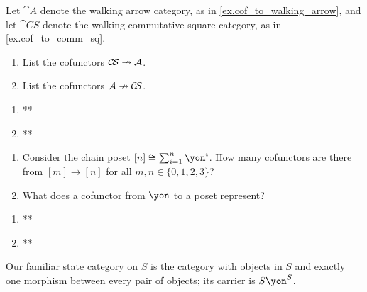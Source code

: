 \documentclass[Book-Poly]{subfiles}
\begin{document}
\begin{exercise}
Let $\cat{A}$ denote the walking arrow category, as in \cref{ex.cof_to_walking_arrow}, and let $\cat{C\!S}$ denote the walking commutative square category, as in \cref{ex.cof_to_comm_sq}.
\begin{enumerate}
    \item List the cofunctors $\mathcal{C\!S}\nrightarrow\mathcal{A}$.
    \item List the cofunctors $\mathcal{A}\nrightarrow\mathcal{C\!S}$.\qedhere
\end{enumerate}
\begin{solution}
\begin{enumerate}
    \item **
    \item **
\end{enumerate}
\end{solution}
\end{exercise}

\begin{exercise}
\begin{enumerate}
	\item Consider the chain poset $[n]\cong\sum_{i=1}^n\yon^i$.
	How many cofunctors are there from $[m]\to[n]$ for all $m,n\in\{0,1,2,3\}$?
	\item What does a cofunctor from $\yon$ to a poset represent? %
\qedhere
\end{enumerate}
\begin{solution}
\begin{enumerate}
    \item **
    \item **
\end{enumerate}
\end{solution}
\end{exercise}

\begin{example}
Our familiar state category on $S$ is the category with objects in $S$ and exactly one morphism between every pair of objects; its carrier is $S\yon^S$.
\end{example}
\end{document}

